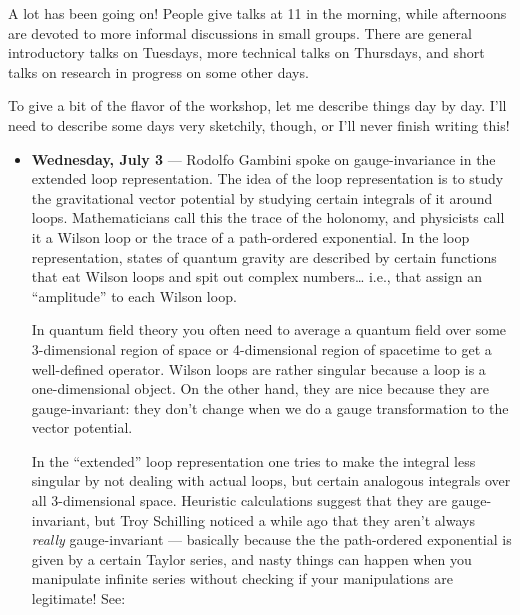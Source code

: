 \documentclass{article}
\def\tightlist{}
\renewcommand{\texttt}[1]{%
  \begingroup
  \ttfamily
  \begingroup\lccode`~=`/\lowercase{\endgroup\def~}{/\discretionary{}{}{}}%
  \begingroup\lccode`~=`[\lowercase{\endgroup\def~}{[\discretionary{}{}{}}%
  \begingroup\lccode`~=`.\lowercase{\endgroup\def~}{.\discretionary{}{}{}}%
  \catcode`/=\active\catcode`[=\active\catcode`.=\active
  \scantokens{#1\noexpand}%
  \endgroup
}
\begin{document}
A lot has been going on! People give talks at 11 in the morning, while
afternoons are devoted to more informal discussions in small groups.
There are general introductory talks on Tuesdays, more technical talks
on Thursdays, and short talks on research in progress on some other
days.

To give a bit of the flavor of the workshop, let me describe things day
by day. I'll need to describe some days very sketchily, though, or I'll
never finish writing this!

\begin{itemize}
\item
  \textbf{Wednesday, July 3} --- Rodolfo Gambini spoke on
  gauge-invariance in the extended loop representation. The idea of the
  loop representation is to study the gravitational vector potential by
  studying certain integrals of it around loops. Mathematicians call
  this the trace of the holonomy, and physicists call it a Wilson loop
  or the trace of a path-ordered exponential. In the loop
  representation, states of quantum gravity are described by certain
  functions that eat Wilson loops and spit out complex numbers\ldots{}
  i.e., that assign an ``amplitude'' to each Wilson loop.

  In quantum field theory you often need to average a quantum field over
  some 3-dimensional region of space or 4-dimensional region of
  spacetime to get a well-defined operator. Wilson loops are rather
  singular because a loop is a one-dimensional object. On the other
  hand, they are nice because they are gauge-invariant: they don't
  change when we do a gauge transformation to the vector potential.

  In the ``extended'' loop representation one tries to make the integral
  less singular by not dealing with actual loops, but certain analogous
  integrals over all 3-dimensional space. Heuristic calculations suggest
  that they are gauge-invariant, but Troy Schilling noticed a while ago
  that they aren't always \emph{really} gauge-invariant --- basically
  because the the path-ordered exponential is given by a certain Taylor
  series, and nasty things can happen when you manipulate infinite
  series without checking if your manipulations are legitimate! See:



\end{itemize}
\end{document}
